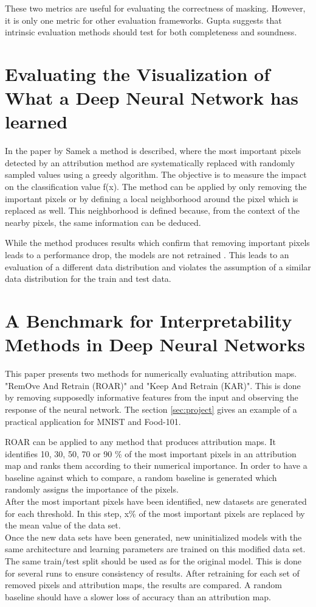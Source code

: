 These two metrics are useful for evaluating the correctness of masking. However, it is only one metric for other evaluation frameworks. Gupta suggests that intrinsic evaluation methods should test for both completeness and soundness.

\section{Evaluating the Visualization of What a Deep Neural Network has learned}
\label{pertubation}

In the paper by Samek\cite{samek2017} a method is described, where the most important pixels detected by an attribution method are systematically replaced with randomly sampled values using a greedy algorithm. The objective is to measure the impact on the classification value f(x). The method can be applied by only removing the important pixels or by defining a local neighborhood around the pixel which is replaced as well. This neighborhood is defined because, from the context of the nearby pixels, the same information can be deduced.

While the method produces results which confirm that removing important pixels leads to a performance drop, the models are not retrained \cite{hooker2019benchmark}. This leads to an evaluation of a different data distribution and violates the assumption of a similar data distribution for the train and test data.

\section{A Benchmark for Interpretability Methods in Deep Neural Networks }

This paper \cite{hooker2019benchmark} presents two methods for numerically evaluating attribution maps. "RemOve And Retrain (ROAR)" and "Keep And Retrain (KAR)". This is done by removing supposedly informative features from the input and observing the response of the neural network. The section \ref{sec:project} gives an example of a practical application for MNIST\cite{deng2012mnist} and Food-101\cite{bossard14}.


ROAR can be applied to any method that produces attribution maps. It identifies 10, 30, 50, 70 or 90 \% of the most important pixels in an attribution map and ranks them according to their numerical importance. In order to have a baseline against which to compare, a random baseline is generated which randomly assigns the importance of the pixels.\\ After the most important pixels have been identified, new datasets are generated for each threshold. In this step, x\% of the most important pixels are replaced by the mean value of the data set.\\
Once the new data sets have been generated, new uninitialized models with the same architecture and learning parameters are trained on this modified data set. The same train/test split should be used as for the original model. This is done for several runs to ensure consistency of results.
After retraining for each set of removed pixels and attribution maps, the results are compared. A random baseline should have a slower loss of accuracy than an attribution map.

